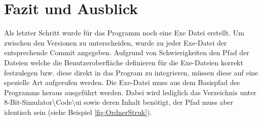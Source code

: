 \documentclass[12pt]{article}
\begin{document}
\newpage

\section{Fazit und Ausblick}
Als letzter Schritt wurde für das Programm noch eine Exe Datei erstellt. Um zwischen den Versionen zu unterscheiden, wurde zu jeder Exe-Datei der entsprechende Commit angegeben. Aufgrund von Schwierigkeiten den Pfad der Dateien welche die Benutzeroberfläche definieren für die Exe-Dateien korrekt festzulegen bzw. diese direkt in das Program zu integrieren, müssen diese auf eine spezielle Art aufgerufen werden. Die Exe-Datei muss aus dem Basispfad des Programms heraus ausgeführt werden. Dabei wird lediglich das Verzeichnis unter 8-Bit-Simulator\textbackslash Code\textbackslash ui sowie deren Inhalt benötigt, der Pfad muss aber identisch sein (siehe Beispiel \ref{fig:OrdnerStruk}).
\end{document}
